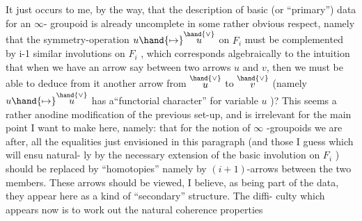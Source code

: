 It just occurs to me, by the way, that the  description of basic (or
``primary'') data for an $\infty$- groupoid is already uncomplete in some rather
obvious respect, namely that the symmetry-operation  $u \hand{\mapsto} \overset{\hand{\vee}}{u}$ on $F_i$ must
be complemented by i-1 similar involutions on $F_i$ , which corresponds
algebraically to the intuition that when we have an  arrow \hand{$\lambda$} say between
two  arrows $u$ and $v$, then we must be able to deduce from it another arrow
from $\overset{\hand{\vee}}{u}$ to $\overset{\hand{\vee}}{v}$ (namely $u \hand{\mapsto} \overset{\hand{\vee}}{u}$ has a``functorial character'' for variable
$u$ )? This seems a rather anodine modification of the previous set-up,
and is irrelevant for the main point I want to make here, namely: that
for the notion of $\infty$ -groupoids we are after, all the equalities just
envisioned in this paragraph (and those I guess which will ensu natural-%
ly by the necessary extension of the basic involution on $F_i$ ) should be
replaced by ``homotopies''\hand{,} namely by $(i+1)$-arrows between the two members.
These arrows should be viewed, I believe, as being part of the data, 
 they appear here as a kind of ``secondary'' structure. The diffi-%
culty which appears now is to work out the natural coherence properties

